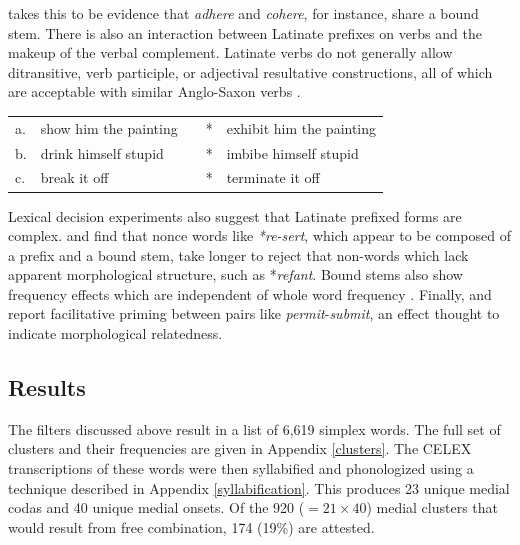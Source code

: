\noindent
\citeauthor{Aronoff1976} takes this to be evidence that \emph{adhere} and \emph{cohere}, for instance, share a bound stem.
There is also an interaction between Latinate prefixes on verbs and the makeup of the verbal complement. 
Latinate verbs do not generally allow ditransitive, verb participle, or adjectival resultative constructions, all of which are acceptable with similar Anglo-Saxon verbs \citep{Gropen1989,Harley2009}.

\begin{example} 
\label{harley}
\begin{tabular}{l l l l@{} l}
a. & {show him the painting} & \alt{} & * & {exhibit him the painting} \\
b. & {drink himself stupid}  & \alt{} & * & {imbibe himself stupid}    \\
c. & {break it off}           & \alt{} & * & {terminate it off}        \\
\end{tabular}
\end{example}

Lexical decision experiments also suggest that Latinate prefixed forms are complex. \citet{Taft1975,Taft1976} and \citet{Taft1986} find that nonce words like \emph{*re-sert}, which appear to be composed of a prefix and a bound stem, take longer to reject that non-words which lack apparent morphological structure, such as *\emph{refant}. 
Bound stems also show frequency effects which are independent of whole word frequency \citep{Taft1979,Taft2006}. 
Finally, \citet{Emmorey1989} and \citet{Forster2000} report facilitative priming between pairs like \emph{permit}-\emph{submit}, an effect thought to indicate morphological relatedness.

\subsection{Results}

The filters discussed above result in a list of 6,619 simplex words.
The full set of clusters and their frequencies are given in Appendix \ref{clusters}.
The CELEX transcriptions of these words were then syllabified and phonologized using a technique described in Appendix \ref{syllabification}. 
This produces 23 unique medial codas and 40 unique medial onsets. 
Of the 920 ($= 21 \times 40$) medial clusters that would result from free combination, 174 (19\%) are attested. 

